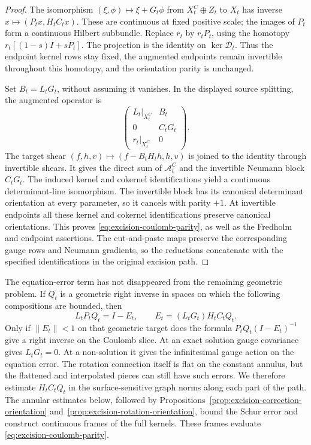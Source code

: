 \documentclass[11pt]{amsart}
\theoremstyle{definition}
\theoremstyle{remark}
\theoremstyle{plain}
\begin{document}
\begin{proof}
The isomorphism
$(\xi,\phi)\mapsto\xi+G_t\phi$ from $X_t^C\oplus Z_t$ to
$X_t$ has inverse $x\mapsto(P_tx,H_tC_tx)$.
These are continuous at fixed positive scale; the images
of $P_t$ form a continuous Hilbert subbundle.
Replace $r_t$ by $r_tP_t$, using the homotopy
$r_t[(1-s)I+sP_t]$.
The projection is the identity on $\ker\mathcal D_t$.
Thus the endpoint kernel rows stay fixed, the augmented
endpoints remain invertible throughout this homotopy,
and the orientation parity is unchanged.

Set $B_t=L_tG_t$, without assuming it vanishes.
In the displayed source splitting, the augmented operator is
\[
 \begin{pmatrix}
       L_t|_{X_t^C}&B_t\\
       0&C_tG_t\\
       r_t|_{X_t^C}&0
 \end{pmatrix}.
\]
The target shear
$(f,h,v)\mapsto(f-B_tH_th,h,v)$ is joined to the identity
through invertible shears. It gives the direct sum of
$\mathcal A_t^C$ and the invertible Neumann block $C_tG_t$.
The induced kernel and cokernel identifications yield a
continuous determinant-line isomorphism. The invertible block
has its canonical determinant orientation at every parameter,
so it cancels with parity $+1$. At invertible endpoints all
these kernel and cokernel identifications preserve canonical
orientations. This proves \eqref{eq:excision-coulomb-parity},
as well as the Fredholm and endpoint assertions.
The cut-and-paste maps preserve the corresponding gauge rows
and Neumann gradients, so the reductions concatenate with the
specified identifications in the original excision path.
\end{proof}

The equation-error term has not disappeared from the remaining
geometric problem. If $Q_t$ is a geometric right inverse
in spaces on which the following compositions are bounded, then
\begin{equation}\label{eq:excision-equation-error-schur}
 L_tP_tQ_t=I-E_t,\qquad
                     E_t=(L_tG_t)H_tC_tQ_t.
\end{equation}
Only if $\|E_t\|<1$ on that geometric target does the formula
$P_tQ_t(I-E_t)^{-1}$ give a right inverse on the Coulomb slice.
At an exact solution gauge covariance gives $L_tG_t=0$.
At a non-solution it gives the infinitesimal gauge action
on the equation error. The rotation connection itself is flat
on the constant annulus, but the flattened and interpolated
pieces can still have such errors.
We therefore estimate $H_tC_tQ_t$ in the surface-sensitive graph
norms along each part of the path. The annular estimates below,
followed by Propositions~\ref{prop:excision-correction-orientation}
and~\ref{prop:excision-rotation-orientation}, bound the Schur error
and construct continuous frames of the full kernels. These frames
evaluate \eqref{eq:excision-coulomb-parity}.
\end{document}
